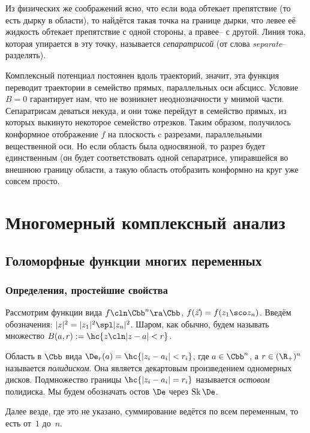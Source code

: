 \documentclass[a4paper]{article}
\DeclareMathOperator{\Sk}{Sk}
\begin{document}
Из физических же соображений ясно, что если вода обтекает препятствие (то есть дырку
в области), то найдётся такая точка на границе дырки, что левее её жидкость обтекает препятствие
с одной стороны, а правее-- с другой. Линия тока, которая упирается в эту точку,
называется \emph{сепаратрисой} (от слова \emph{separate}-- разделять).

Комплексный потенциал постоянен вдоль траекторий, значит, эта функция переводит траектории
в семейство прямых, параллельных оси абсцисс. Условие $B=0$ гарантирует нам, что не возникнет
неоднозначности у мнимой части. Сепаратрисам деваться некуда, и они тоже перейдут в семейство
прямых, из которых выкинуто некоторое семейство отрезков. Таким образом, получилось конформное
отображение $f$ на плоскость c разрезами, параллельными вещественной оси. Но если область была
односвязной, то разрез будет единственным (он будет соответствовать одной сепаратрисе, упиравшейся во внешнюю
границу области, а такую область отобразить конформно на круг уже совсем просто.

\section{Многомерный комплексный анализ}

\subsection{Голоморфные функции многих переменных}

\subsubsection{Определения, простейшие свойства}

Рассмотрим функции вида $f\cln \Cbb^n\ra\Cbb$, $f(\vec z) = f(z_1\sco z_n)$.
Введём обозначения: $|z|^2 = |z_1|^2\spl|z_n|^2$. Шаром, как обычно, будем называть
множество $B(a,r) := \hc{z\cln |z-a|< r}$.

\begin{df}
Область в $\Cbb$ вида $\De_r(a)=\hc{|z_i-a_i| < r_i}$, где $a\in \Cbb^n$, а
$r\in (\R_+)^n$ называется \emph{полидиском}. Она является декартовым произведением
одномерных дисков. Подмножество границы $\hc{|z_i-a_i|=r_i}$
называется \emph{остовом} полидиска. Мы будем обозначать остов $\De$ через $\Sk \De$.
\end{df}


Далее везде, где это не указано, суммирование ведётся по всем переменным, то есть от~$1$ до~$n$.
\end{document}
